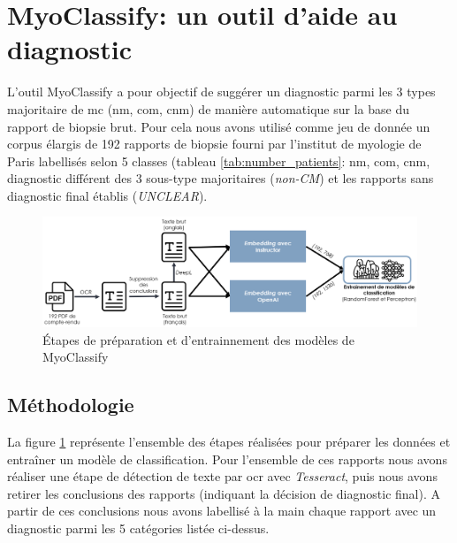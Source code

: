 \section{MyoClassify: un outil d'aide au diagnostic}
L'outil MyoClassify a pour objectif de suggérer un diagnostic parmi les 3 types majoritaire de \gls{mc}  (\gls{nm}, \gls{com}, \gls{cnm}) de manière automatique sur la base du rapport de biopsie brut. Pour cela nous avons utilisé comme jeu de donnée un corpus élargis de 192 rapports de biopsie fourni par l'institut de myologie de Paris labellisés selon 5 classes (tableau \ref{tab:number_patients}: \gls{nm}, \gls{com}, \gls{cnm}, diagnostic différent des 3 sous-type majoritaires (\textit{non-CM}) et les rapports sans diagnostic final établis (\textit{UNCLEAR}).
\begin{figure}[htbp]
  \centering
  \includegraphics[width=1\textwidth]{figures/myoclassify_flow.png}
  \caption[Entraînement modèle MyoClassify]{Étapes de préparation et d'entrainnement des modèles de MyoClassify}
  \label{fig:myoclassify_flow}
\end{figure}
\subsection{Méthodologie}
La figure \ref{fig:myoclassify_flow} représente l'ensemble des étapes réalisées pour préparer les données et entraîner un modèle de classification. Pour l'ensemble de ces rapports nous avons réaliser une étape de détection de texte par \gls{ocr} avec \textit{Tesseract}, puis nous avons retirer les conclusions des rapports (indiquant la décision de diagnostic final). A partir de ces conclusions nous avons labellisé à la main chaque rapport avec un diagnostic parmi les 5 catégories listée ci-dessus.

